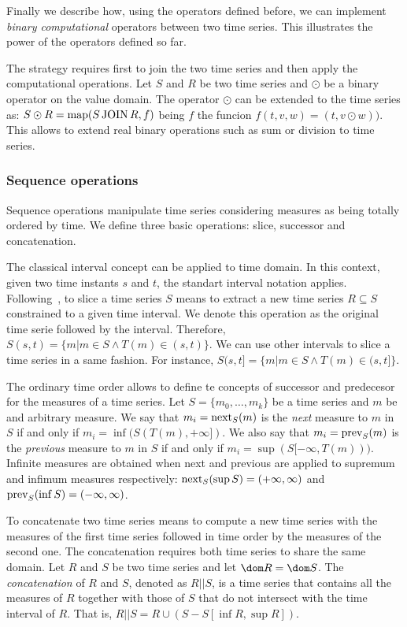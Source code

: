 
Finally we describe how, using the operators defined before, we can
implement \emph{binary computational} operators between two time
series. This illustrates the power of the operators defined so far.
%

The strategy requires first to join the two time series and then
apply the computational operations. 
%
Let $S$ and $R$ be two time series and $\odot$ be a binary operator on
the value domain. The operator $\odot$ can be extended to the time
series as:
%
$S\odot R=\operatorname*{map}(S\operatorname*{JOIN} R, f)$ being $f$ the funcion
$f(t,v,w)=(t,v\odot w))$.
%
This allows to extend real binary operations such as sum or division
to time series.  


\subsubsection{Sequence operations}

Sequence operations manipulate time series considering measures as
being totally ordered by time.  We define three basic operations:
slice, successor and concatenation.


The classical interval concept can be applied to time domain. In this
context, given two time instants $s$ and $t$, the standart interval
notation applies.
%
Following~\cite{last:hetland}, to slice a time series $S$ means to
extract a new time series $R\subseteq S$ constrained to a given time
interval. We denote this operation as the original time serie followed
by the interval. Therefore, $S(s,t)=\{m|m\in S \wedge
T(m)\in(s,t)\}$. We can use other intervals to slice a time series in
a same fashion. For instance, $S(s,t]=\{m|m\in S \wedge
T(m)\in(s,t]\}$.

The ordinary time order allows to define te concepts of successor and
predecesor for the measures of a time series.
%
Let $S=\{m_0,\ldots,m_k\}$ be a time series and $m$ be and arbitrary
measure.
%
We say that $m_i=\operatorname*{next}_S(m)$ is the \emph{next} measure to $m$ in $S$ if and
only if $m_i=\inf(S(T(m),+\infty])$.  
%
We also say that $m_i=\operatorname*{prev}_S(m)$ is the \emph{previous} measure to
$m$ in $S$ if and only if $m_i=\sup(S[-\infty,T(m)))$. 
%
Infinite measures are obtained when next and previous are applied to
supremum and infimum measures respectively: $\operatorname*{next}_S(\sup
S)=(+\infty,\infty)$ and $\operatorname*{prev}_S(\inf S)=(-\infty,\infty)$.

To concatenate two time series means to compute a new time series with
the measures of the first time series followed in time order by the
measures of the second one. 
%
The concatenation requires both time series to share the same domain.
Let $R$ and $S$ be two time series and let $\dom R=\dom S$. The
\emph{concatenation} of $R$ and $S$, denoted as $R||S$, is a time
series that contains all the measures of $R$ together with those of
$S$ that do not intersect with the time interval of $R$. That is,
$R||S= R\cup (S - S[\inf R,\sup R])$.



